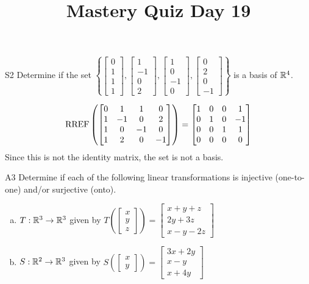 \documentclass{sbgLAquiz}
\title{Mastery Quiz Day 19 }
\begin{document}
\begin{problem}{S2}
Determine if the set $\left\{ \begin{bmatrix} 0 \\ 1 \\ 1 \\ 1 \end{bmatrix}, \begin{bmatrix} 1 \\ -1 \\ 0 \\ 2 \end{bmatrix}, \begin{bmatrix} 1 \\ 0 \\ -1 \\ 0 \end{bmatrix}, \begin{bmatrix}0 \\ 2 \\ 0 \\ -1 \end{bmatrix} \right\}$ is a basis of $\mathbb{R}^4$.
\end{problem}
\begin{solution}
$$\operatorname{RREF}\left(\begin{bmatrix} 0 & 1 & 1 & 0 \\ 1 & -1 & 0 & 2   \\ 1 & 0 & -1 & 0  \\ 1 & 2 & 0 & -1  \end{bmatrix} \right) = \begin{bmatrix} 1 & 0 & 0 & 1  \\ 0 & 1 & 0 & -1  \\ 0 & 0 & 1 & 1  \\ 0 & 0 & 0 & 0 \end{bmatrix} $$
Since this is not the identity matrix, the set is not a basis.
\end{solution}
\begin{problem}{A3}
Determine if each of the following linear transformations is injective (one-to-one) and/or surjective (onto).
\begin{enumerate}[(a)]
\item $T: \mathbb{R}^3 \rightarrow \mathbb{R}^3$ given by $T\left(\begin{bmatrix} x \\ y \\ z  \end{bmatrix} \right) = \begin{bmatrix} x+y+z \\ 2y+3z \\ x-y-2z \end{bmatrix} $
\item $S: \mathbb{R}^2 \rightarrow \mathbb{R}^3$ given by $S\left(\begin{bmatrix} x \\ y  \end{bmatrix} \right) = \begin{bmatrix} 3x+2y \\ x-y \\ x+4y \end{bmatrix} $
\end{enumerate}
\end{problem}
\end{document}
